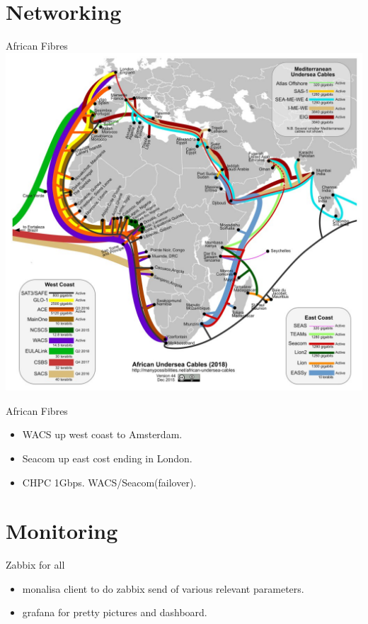 \documentclass[10pt]{beamer}
\begin{document}
\section{Networking}
\begin{frame}{African Fibres}
  \includegraphics[scale=1]{african_undersea_cables.jpg} 
\end{frame}
\begin{frame}{African Fibres}
  \begin{itemize}
    \item WACS up west coast to Amsterdam.
    \item Seacom up east cost ending in London.
    \item CHPC 1Gbps. WACS/Seacom(failover).
  \end{itemize}
\end{frame}


\section{Monitoring}
\begin{frame}{Zabbix for all}
  \begin{itemize}
    \item monalisa client to do zabbix send of various relevant parameters.
    \item grafana for pretty pictures and dashboard.
  \end{itemize}
\end{frame}
\end{document}
